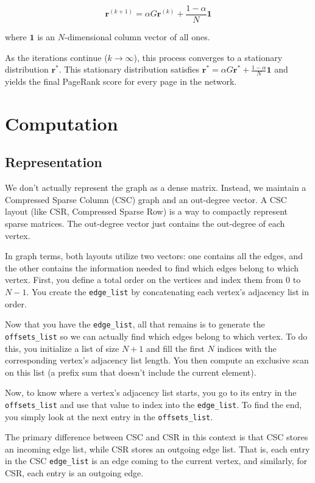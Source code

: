 \documentclass[11pt, a4paper]{article}
\begin{document}
\[ \mathbf{r}^{(k+1)} = \alpha G \mathbf{r}^{(k)} + \frac{1 - \alpha}{N} \mathbf{1} \]

where $\mathbf{1}$ is an $N$-dimensional column vector of all ones.

As the iterations continue ($k \to \infty$), this process converges to a stationary distribution $\mathbf{r}^*$. This stationary distribution satisfies $\mathbf{r}^* = \alpha G \mathbf{r}^* + \frac{1 - \alpha}{N} \mathbf{1}$ and yields the final PageRank score for every page in the network.

\section{Computation}
\subsection{Representation}
We don't actually represent the graph as a dense matrix. Instead, we maintain a Compressed Sparse Column (CSC) graph and an out-degree vector. A CSC layout (like CSR, Compressed Sparse Row) is a way to compactly represent sparse matrices. The out-degree vector just contains the out-degree of each vertex.

In graph terms, both layouts utilize two vectors: one contains all the edges, and the other contains the information needed to find which edges belong to which vertex. First, you define a total order on the vertices and index them from $0$ to $N - 1$. You create the \texttt{edge\_list} by concatenating each vertex's adjacency list in order.

Now that you have the \texttt{edge\_list}, all that remains is to generate the \texttt{offsets\_list} so we can actually find which edges belong to which vertex. To do this, you initialize a list of size $N+1$ and fill the first $N$ indices with the corresponding vertex's adjacency list length. You then compute an exclusive scan on this list (a prefix sum that doesn't include the current element).

Now, to know where a vertex's adjacency list starts, you go to its entry in the \texttt{offsets\_list} and use that value to index into the \texttt{edge\_list}. To find the end, you simply look at the next entry in the \texttt{offsets\_list}.

The primary difference between CSC and CSR in this context is that CSC stores an incoming edge list, while CSR stores an outgoing edge list. That is, each entry in the CSC \texttt{edge\_list} is an edge coming to the current vertex, and similarly, for CSR, each entry is an outgoing edge.
\end{document}
